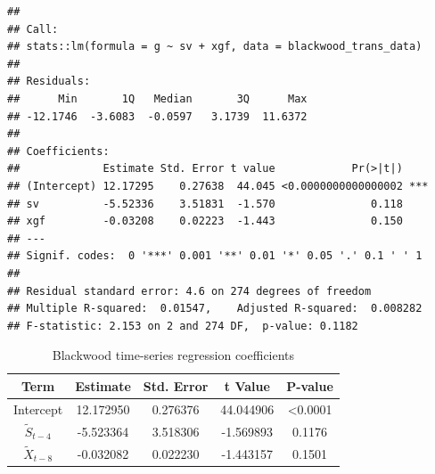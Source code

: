 \documentclass[
  10pt,
]{extarticle}
\begin{document}
\begin{verbatim}
## 
## Call:
## stats::lm(formula = g ~ sv + xgf, data = blackwood_trans_data)
## 
## Residuals:
##      Min       1Q   Median       3Q      Max 
## -12.1746  -3.6083  -0.0597   3.1739  11.6372 
## 
## Coefficients:
##             Estimate Std. Error t value            Pr(>|t|)    
## (Intercept) 12.17295    0.27638  44.045 <0.0000000000000002 ***
## sv          -5.52336    3.51831  -1.570               0.118    
## xgf         -0.03208    0.02223  -1.443               0.150    
## ---
## Signif. codes:  0 '***' 0.001 '**' 0.01 '*' 0.05 '.' 0.1 ' ' 1
## 
## Residual standard error: 4.6 on 274 degrees of freedom
## Multiple R-squared:  0.01547,    Adjusted R-squared:  0.008282 
## F-statistic: 2.153 on 2 and 274 DF,  p-value: 0.1182
\end{verbatim}

\begin{center}
\scriptsize
\begin{table}[H]

\caption{\label{tab:p1-blackwood-reg-comparison}Blackwood detrended-response and transformed-detrended-response regression comparison}
\centering
{}
\end{table}
\normalsize
\end{center}

\begin{center}
\scriptsize
\begin{table}[H]

\caption{\label{tab:p1-blackwood-reg-coef}Blackwood time-series regression coefficients}
\centering
\begin{tabular}[t]{ccccc}
\toprule
Term & Estimate & Std. Error & t Value & P-value\\
\midrule
Intercept & 12.172950 & 0.276376 & 44.044906 & <0.0001\\
$\tilde{S}_{t-4}$ & -5.523364 & 3.518306 & -1.569893 & 0.1176\\
$\tilde{X}_{t-8}$ & -0.032082 & 0.022230 & -1.443157 & 0.1501\\
\bottomrule
\end{tabular}
\end{table}
\normalsize
\end{center}
\end{document}
